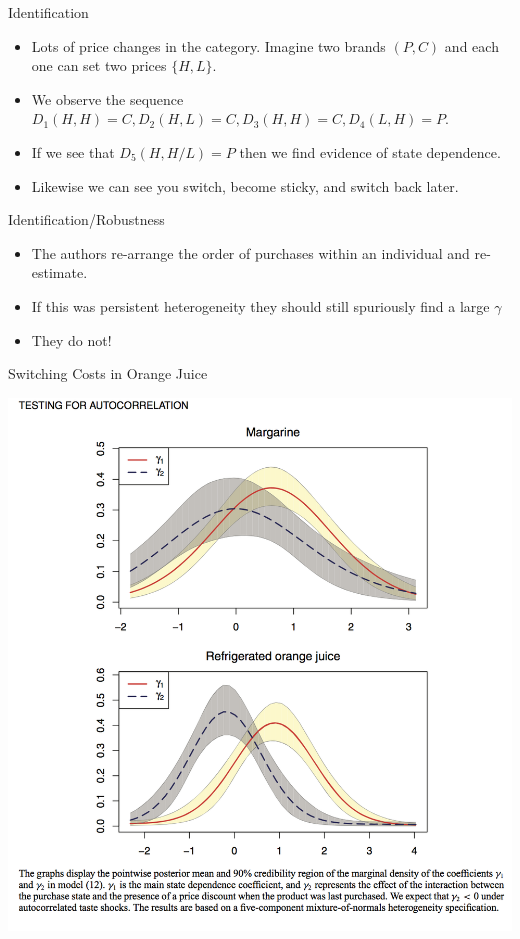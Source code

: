 \documentclass[xcolor=pdftex,dvipsnames,table,mathserif]{beamer}
\begin{document}
\begin{frame}{Identification}
\begin{itemize}
\item Lots of price changes in the category. Imagine two brands $(P,C)$ and each one can set two prices $\{H,L\}$.
\item We observe the sequence $D_1(H,H) = C, D_2(H,L) = C, D_3(H,H) = C, D_4(L,H) = P$.
\item If we see that $D_5(H,H/L) = P$ then we find evidence of state dependence.
\item Likewise we can see you switch, become sticky, and switch back later.
\end{itemize}
\end{frame} 

\begin{frame}{Identification/Robustness}
\begin{itemize}
\item The authors re-arrange the order of purchases within an individual and re-estimate.
\item If this was persistent heterogeneity they should still spuriously find a large $\gamma$
\item They do not!
\end{itemize}
\end{frame}
 
\begin{frame}{Switching Costs in Orange Juice}
\begin{center}
\includegraphics[scale=0.33]{resources/OJ_F5.png}
\end{center}
\end{frame}
\end{document}
